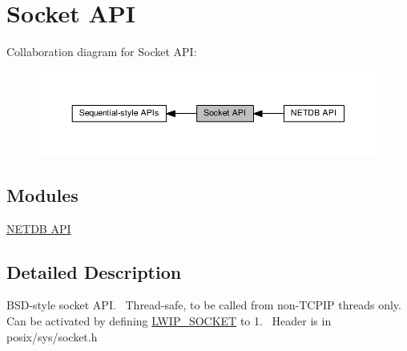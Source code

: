 \hypertarget{group__socket}{}\section{Socket A\+PI}
\label{group__socket}
Collaboration diagram for Socket A\+PI\+:
\nopagebreak
\begin{figure}[H]
\begin{center}
\leavevmode
\includegraphics[width=350pt]{group__socket}
\end{center}
\end{figure}
\subsection*{Modules}
\begin{DoxyCompactItemize}
\item 
\hyperlink{group__netdbapi}{N\+E\+T\+D\+B A\+PI}
\end{DoxyCompactItemize}


\subsection{Detailed Description}
B\+S\+D-\/style socket A\+PI.~\newline
Thread-\/safe, to be called from non-\/\+T\+C\+P\+IP threads only.~\newline
Can be activated by defining \hyperlink{openmote-cc2538_2lwip_2test_2unit_2lwipopts_8h_a1cb62ce61ac39d7d6728ae5d3d3b927f}{L\+W\+I\+P\+\_\+\+S\+O\+C\+K\+ET} to 1.~\newline
Header is in posix/sys/socket.\+h{\bfseries } 
